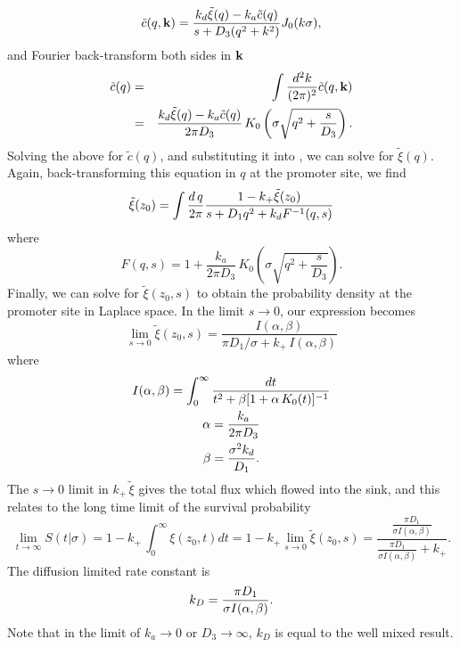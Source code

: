 \begin{equation}
 \tilde{c}(q,{\bf k}) = \frac{k_d \tilde{\xi}(q) - k_a\tilde{c}(q)}{s + D_3(q^2 + k^2)} J_{0}(k \sigma ),
\end{equation}
and Fourier back-transform both sides in ${\bf k}$
\begin{eqnarray}
 \elabel{FourierBackC}
 \tilde{c}(q) & = & \int \frac{d^2 k}{(2 \pi)^2} \tilde{c}(q,{\bf k}) \\
 & = & \frac{k_d \tilde{\xi}(q) - k_a\tilde{c}(q)}{2 \pi D_3} \, K_{0}\left( \sigma \sqrt{q^2 + \frac{s}{D_3}} \right).
\end{eqnarray}
Solving the above for $\tilde{c}(q)$, and substituting it into , we can solve for $\tilde{\xi}(q)$. Again, back-transforming this equation in $q$ at the promoter site, we find
\begin{equation}
 \tilde{\xi}(z_0) = \int \frac{d\,q}{2 \pi} \frac{1-k_+ \tilde{\xi}(z_0)}{s + D_1 q^2+k_d F^{-1}(q,s)}
 \elabel{FDE_dna2}
\end{equation}
where
\begin{equation}
F(q,s) = 1 + \frac{k_a}{2 \pi D_3} \, K_{0}\left( \sigma \sqrt{q^2 + \frac{s}{D_3}} \right).
\end{equation}
Finally, we can solve  for $\tilde{\xi}(z_0, s)$ to obtain the probability density at the promoter site in Laplace space. In the limit $s \to 0$, our expression becomes
\begin{equation}
 \lim_{s \to 0} \tilde{\xi}(z_0, s) = \frac{I(\alpha,\beta)}{\pi D_1 / \sigma + k_+ \, I(\alpha,\beta)}
\end{equation}
where
\begin{gather}
 I(\alpha,\beta) = \int_0^{\infty} \frac{dt}{t^2 + \beta[1 + \alpha \, K_0(t)]^{-1}} \\
 \alpha = \frac{k_a}{2 \pi D_3} \elabel{EqAlpha} \\
 \beta = \frac{\sigma^2 k_d}{D_1} \elabel{EqBeta}.
\end{gather}
The $s \to 0$ limit in $k_+ \, \tilde{\xi}$ gives the total flux which flowed into the sink, and this relates to the long time limit of the survival probability
\begin{equation}
  \lim_{t \to \infty}S(t|\sigma) = 1 - k_+ \, \int_0^{\infty} \xi(z_0, t) dt = 1 - k_+ \lim_{s \to 0} \tilde{\xi}(z_0, s) = \frac{\frac{\pi D_1}{\sigma I(\alpha,\beta)}}{\frac{\pi D_1}{\sigma I(\alpha,\beta)} + k_+}.
\end{equation}
The diffusion limited rate constant is
\begin{equation}
 k_D = \frac{\pi D_1}{\sigma I(\alpha,\beta)}.
 \elabel{kDFullJ}
\end{equation}
Note that in the limit of $k_a\to0$ or $D_3\to\infty$, $k_D$ is equal to the well mixed result.

